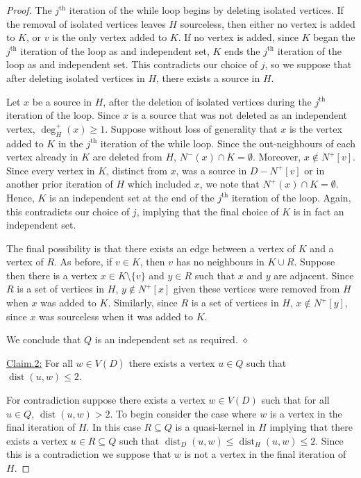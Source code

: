 \documentclass[12pt]{article}
\theoremstyle{definition}
\DeclareMathOperator{\dist}{dist}
\begin{document}
\begin{proof}
    The  $j^{\text{th}}$ iteration of the while loop begins by deleting isolated vertices.
    If the removal of isolated vertices leaves $H$ sourceless, then 
    either no vertex is added to $K$, or $v$ is the only vertex added to $K$.
    If no vertex is added, since $K$ began the  $j^{\text{th}}$ iteration of the loop as 
    and independent set, $K$ ends the $j^{\text{th}}$ iteration of the loop as 
    and independent set.
    This contradicts our choice of $j$, so we suppose that after deleting isolated vertices in $H$, there exists a source in $H$.

    Let $x$ be a source in $H$, after the deletion of isolated vertices during the $j^{\text{th}}$ iteration of the loop.
    Since $x$ is a source that was not deleted as an independent vertex, $\deg^+_H(x) \geq 1$.
    Suppose without loss of generality that $x$ is the vertex added to $K$ in the $j^{\text{th}}$ iteration of the while loop.
    Since the out-neighbours of each vertex already in $K$ are deleted from $H$,
    $N^-(x) \cap K = \emptyset$.
    Moreover, $x \notin N^+[v]$.
    Since every vertex in $K$, distinct from $x$, was a source in $D-N^+[v]$
    or in another prior iteration of $H$ which included $x$,
    we note that $N^+(x) \cap K = \emptyset$.
    Hence, $K$ is an independent set at the end of the  $j^{\text{th}}$ iteration of the loop.
    Again, this contradicts our choice of $j$, implying that the final choice of $K$ is in fact an independent set.

    The final possibility is that there exists an edge between a vertex of $K$ and a vertex of $R$.
    As before, if $v \in K$, then $v$ has no neighbours in $K\cup R$.
    Suppose then there is a vertex $x \in K\setminus \{v\}$ and $y \in R$
    such that $x$ and $y$ are adjacent.
    Since $R$ is a set of vertices in $H$, $y \notin N^+[x]$ given these vertices were removed from $H$ when $x$ was added to $K$.
    Similarly, since $R$ is a set of vertices in $H$, $x \notin N^+[y]$, since $x$ was sourceless when it was added to $K$.

    We conclude that $Q$ is an independent set as required.
\hfill $\diamond$
\vspace{0.25cm}

\vspace{0.25cm}
\noindent\underline{Claim.2:}  For all $w \in V(D)$ there exists a vertex $u\in Q$ such that $\dist(u,w)\leq 2$.
\vspace{0.25cm}  

    For contradiction suppose there exists a vertex $w \in V(D)$ such that for all $u \in Q$, $\dist(u,w) > 2$.
    To begin consider the case where $w$ is a vertex in the final iteration of $H$.
    In this case $R \subseteq Q$ is a quasi-kernel in $H$ implying that there exists a vertex $u \in R \subseteq Q$ 
    such that $\dist_D(u,w)\leq \dist_H(u,w) \leq 2$.
    Since this is a contradiction we suppose that $w$ is not a vertex in the final iteration of $H$.


\end{proof}
\end{document}
